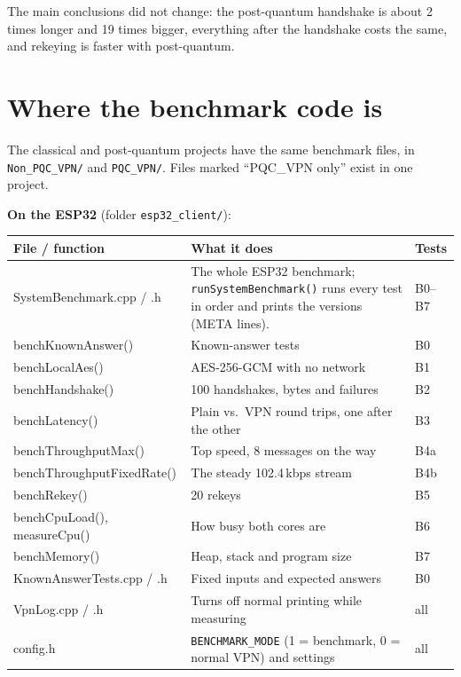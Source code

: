 \documentclass[10pt,a4paper]{article}
\begin{document}
The main conclusions did not change: the post-quantum handshake is about 2 times longer and 19 times
bigger, everything after the handshake costs the same, and rekeying is faster with post-quantum.

\section*{Where the benchmark code is}

The classical and post-quantum projects have the same benchmark files, in \texttt{Non\_PQC\_VPN/} and
\texttt{PQC\_VPN/}. Files marked ``PQC\_VPN only'' exist in one project.

\textbf{On the ESP32} (folder \texttt{esp32\_client/}):
\begin{table}[H]\centering\small
\begin{tabularx}{\linewidth}{>{\ttfamily}lLl}
\toprule
\normalfont File / function & What it does & Tests \\
\midrule
SystemBenchmark.cpp / .h & The whole ESP32 benchmark; \texttt{runSystemBenchmark()} runs every test in order and prints the versions (META lines). & B0--B7 \\
\quad benchKnownAnswer() & Known-answer tests & B0 \\
\quad benchLocalAes() & AES-256-GCM with no network & B1 \\
\quad benchHandshake() & 100 handshakes, bytes and failures & B2 \\
\quad benchLatency() & Plain vs.\ VPN round trips, one after the other & B3 \\
\quad benchThroughputMax() & Top speed, 8 messages on the way & B4a \\
\quad benchThroughputFixedRate() & The steady 102.4\,kbps stream & B4b \\
\quad benchRekey() & 20 rekeys & B5 \\
\quad benchCpuLoad(), measureCpu() & How busy both cores are & B6 \\
\quad benchMemory() & Heap, stack and program size & B7 \\
KnownAnswerTests.cpp / .h & Fixed inputs and expected answers & B0 \\
VpnLog.cpp / .h & Turns off normal printing while measuring & all \\
config.h & \texttt{BENCHMARK\_MODE} (1 = benchmark, 0 = normal VPN) and settings & all \\
\bottomrule
\end{tabularx}
\end{table}
\end{document}
